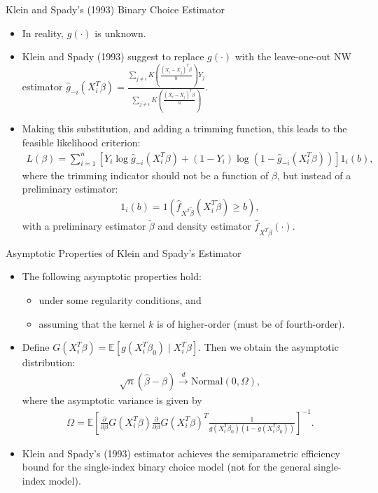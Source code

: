 \documentclass[xcolor=svgnames,dvipdfmx,cjk]{beamer}
\theoremstyle{example}
\def\E{\mathbb{E}}
\def\darrow{\xrightarrow{d}}
\begin{document}
\begin{frame}{Klein and Spady's (1993) Binary Choice Estimator}
 \begin{itemize}
  \item In reality, $g(\cdot)$ is unknown.
  \item Klein and Spady (1993) suggest to replace $g(\cdot)$ with the leave-one-out NW estimator
        $\hat{g}_{-i}(X_i^T \beta) = \frac{\sum_{j \neq i} K \left( \frac{(X_i - X_j)^T \beta}{h}\right)Y_j}{\sum_{j \neq i} K \left( \frac{(X_i - X_j)^T \beta}{h}\right)}.$
  \item Making this substitution, and adding a trimming function, this leads to the feasible likelihood criterion:
        \begin{align*}
          L(\beta) = \sum_{i=1}^{n}[Y_i \log \hat{g}_{-i}(X_i^T \beta) + (1 - Y_i) \log (1 - \hat{g}_{-i}(X_i^T \beta))]1_{i}(b),
        \end{align*}
        where the trimming indicator should not be a function of $\beta$, but instead of a preliminary estimator:
        \begin{align*}
          1_i(b) = 1\left( \hat{f}_{X^T\tilde{\beta}}(X_i^T\tilde{\beta}) \geq b \right),
        \end{align*}
        with a preliminary estimator $\tilde{\beta}$ and density estimator $\hat{f}_{X^T\tilde{\beta}}(\cdot)$.
 \end{itemize} 
\end{frame}

\begin{frame}{Asymptotic Properties of Klein and Spady's Estimator}
\begin{itemize}
  \item The following asymptotic properties hold: 
        \begin{itemize}
          \item under some regularity conditions, and
          \item assuming that the kernel $k$ is of higher-order (must be of fourth-order).
        \end{itemize}
  \item Define $G(X_i^T \beta) = \E[g(X_i^T\beta_0)\mid X_i^T\beta]$. 
        Then we obtain the asymptotic distribution:
        \begin{align*}
          \sqrt{n}(\hat{\beta} - \beta) \darrow \text{Normal}(0, \Omega),
        \end{align*}
        where the asymptotic variance is given by 
        \begin{align*}
          \Omega = \E \left[ 
            \frac{\partial}{\partial\beta}G(X_i^T\beta)
            \frac{\partial}{\partial\beta}G(X_i^T\beta)^T
            \frac{1}{g(X_i^T\beta_0)(1-g(X_i^T\beta_0))}
          \right]^{-1}.
        \end{align*}
  \item Klein and Spady's (1993) estimator achieves \alert{the semiparametric efficiency bound for the single-index binary choice model} (not for the general single-index model).
\end{itemize}
\end{frame}
\end{document}

